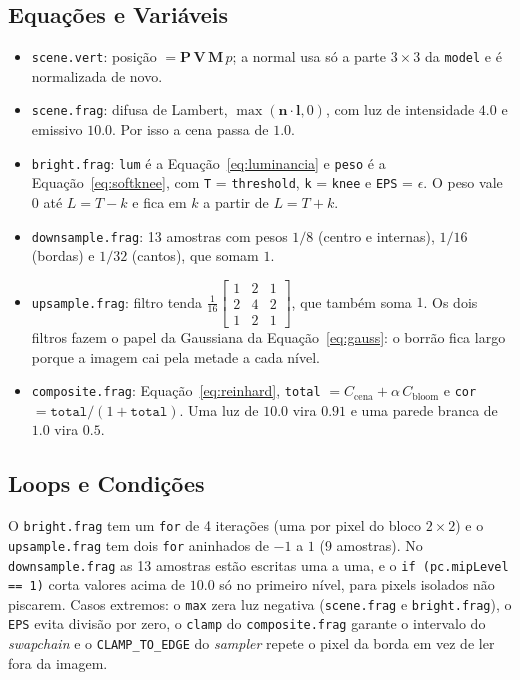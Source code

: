 \subsection{Equações e Variáveis}
\begin{itemize}
    \setlength{\itemsep}{0pt}
    \item \texttt{scene.vert}: posição $= \mathbf{P}\,\mathbf{V}\,\mathbf{M}\,p$; a normal usa só a parte $3 \times 3$ da \texttt{model} e é normalizada de novo.
    \item \texttt{scene.frag}: difusa de Lambert, $\max(\mathbf{n} \cdot \mathbf{l}, 0)$, com luz de intensidade $4.0$ e emissivo $10.0$. Por isso a cena passa de $1.0$.
    \item \texttt{bright.frag}: \texttt{lum} é a Equação~\ref{eq:luminancia} e \texttt{peso} é a Equação~\ref{eq:softknee}, com \texttt{T} = \texttt{threshold}, \texttt{k} = \texttt{knee} e \texttt{EPS} = $\epsilon$. O peso vale $0$ até $L = T - k$ e fica em $k$ a partir de $L = T + k$.
    \item \texttt{downsample.frag}: 13 amostras com pesos $1/8$ (centro e internas), $1/16$ (bordas) e $1/32$ (cantos), que somam $1$.
    \item \texttt{upsample.frag}: filtro tenda $\frac{1}{16}\begin{bmatrix} 1 & 2 & 1 \\ 2 & 4 & 2 \\ 1 & 2 & 1 \end{bmatrix}$, que também soma $1$. Os dois filtros fazem o papel da Gaussiana da Equação~\ref{eq:gauss}: o borrão fica largo porque a imagem cai pela metade a cada nível.
    \item \texttt{composite.frag}: Equação~\ref{eq:reinhard}, \texttt{total} $= C_{\text{cena}} + \alpha\,C_{\text{bloom}}$ e \texttt{cor} $= \texttt{total}/(1 + \texttt{total})$. Uma luz de $10.0$ vira $0.91$ e uma parede branca de $1.0$ vira $0.5$.
\end{itemize}

\subsection{Loops e Condições}
O \texttt{bright.frag} tem um \texttt{for} de 4 iterações (uma por pixel do bloco $2 \times 2$) e o \texttt{upsample.frag} tem dois \texttt{for} aninhados de $-1$ a $1$ (9 amostras). No \texttt{downsample.frag} as 13 amostras estão escritas uma a uma, e o \texttt{if (pc.mipLevel == 1)} corta valores acima de $10.0$ só no primeiro nível, para pixels isolados não piscarem. Casos extremos: o \texttt{max} zera luz negativa (\texttt{scene.frag} e \texttt{bright.frag}), o \texttt{EPS} evita divisão por zero, o \texttt{clamp} do \texttt{composite.frag} garante o intervalo do \textit{swapchain} e o \texttt{CLAMP\_TO\_EDGE} do \textit{sampler} repete o pixel da borda em vez de ler fora da imagem.

